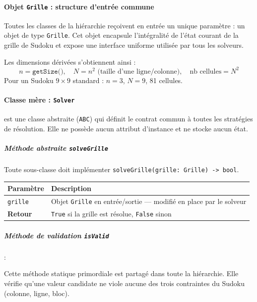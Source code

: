\documentclass[a4paper]{article}
\begin{document}
\paragraph{Objet \texttt{Grille} : structure d'entrée commune}

Toutes les classes de la hiérarchie reçoivent en entrée un unique paramètre : un objet de
type \texttt{Grille}. Cet objet encapsule l'intégralité de l'état courant de la grille de
Sudoku et expose une interface uniforme utilisée par tous les solveurs.

\medskip
Les dimensions dérivées s'obtiennent ainsi :
\[
  n = \texttt{getSize()},\quad N = n^2 \text{ (taille d'une ligne/colonne)},
  \quad \text{nb cellules} = N^2
\]
Pour un Sudoku $9 \times 9$ standard : $n = 3$, $N = 9$, 81 cellules.


\paragraph{Classe mère : \texttt{Solver}}

 est une classe abstraite (\texttt{ABC}) qui définit le contrat commun à
toutes les stratégies de résolution. Elle ne possède aucun attribut d'instance et ne stocke
aucun état.

\subparagraph{Méthode abstraite \texttt{solveGrille}}

Toute sous-classe doit implémenter \texttt{solveGrille(grille: Grille) -> bool}.

\begin{center}
\begin{tabular}{lp{9cm}}
  \toprule
  \textbf{Paramètre} & \textbf{Description} \\
  \midrule
  \texttt{grille} & Objet \texttt{Grille} en entrée/sortie — modifié en place par le solveur \\
  \textbf{Retour} & \texttt{True} si la grille est résolue, \texttt{False} sinon \\
  \bottomrule
\end{tabular}
\end{center}

\subparagraph{Méthode de validation \texttt{isValid}}:

Cette méthode statique  primordiale est partagé dans toute la hiérarchie. Elle vérifie
qu'une valeur candidate ne viole aucune des trois contraintes du Sudoku (colonne, ligne,
bloc).

\end{document}
